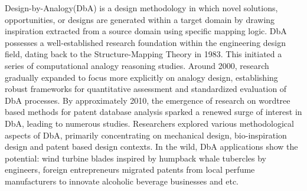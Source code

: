 Design-by-Analogy(DbA) is a design methodology in which novel solutions, opportunities, or designs are generated within a target domain by drawing inspiration extracted from a source domain using specific mapping logic\cite{jiang2022data, fu2014bio, gentner1983structure}. DbA possesses a well-established research foundation within the engineering design field, dating back to the Structure-Mapping Theory in 1983\cite{gentner1983structure}. This initiated a series of computational analogy reasoning studies\cite{hofstadter1984copycat, hummel1997distributed, falkenhainer1989structure, thagard1990analog}. Around 2000, research gradually expanded to focus more explicitly on analogy design, establishing robust frameworks for quantitative assessment and standardized evaluation of DbA processes\cite{mcadams2002quantitative}. By approximately 2010, the emergence of research on wordtree based methods for patent database analysis sparked a renewed surge of interest in DbA\cite{linsey2012design, linsey2008increasing, verhaegen2011identifying}, leading to numerous studies\cite{fu2014bio, fu2015design, jiang2022data}. Researchers explored various methodological aspects of DbA, primarily concentrating on mechanical design\cite{jiang2022data}, bio-inspiration design\cite{fu2014bio} and patent based design\cite{verhaegen2011identifying} contexts. In the wild, DbA applications show the potential: wind turbine blades inspired by humpback whale tubercles by engineers\cite{fu2014bio}, foreign entrepreneurs migrated patents from local perfume manufacturers to innovate alcoholic beverage businesses\cite{andriani2025perfume} and etc.



